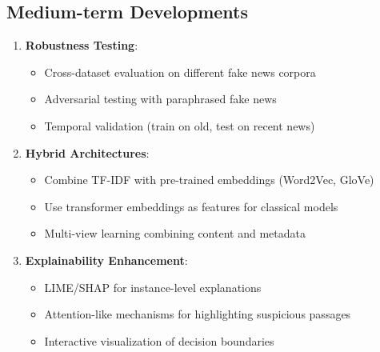 \documentclass[11pt]{article}
\begin{document}
\subsection{Medium-term Developments}
\begin{enumerate}
\item \textbf{Robustness Testing}:
   \begin{itemize}
   \item Cross-dataset evaluation on different fake news corpora
   \item Adversarial testing with paraphrased fake news
   \item Temporal validation (train on old, test on recent news)
   \end{itemize}

\item \textbf{Hybrid Architectures}:
   \begin{itemize}
   \item Combine TF-IDF with pre-trained embeddings (Word2Vec, GloVe)
   \item Use transformer embeddings as features for classical models
   \item Multi-view learning combining content and metadata
   \end{itemize}

\item \textbf{Explainability Enhancement}:
   \begin{itemize}
   \item LIME/SHAP for instance-level explanations
   \item Attention-like mechanisms for highlighting suspicious passages
   \item Interactive visualization of decision boundaries
   \end{itemize}
\end{enumerate}
\end{document}
